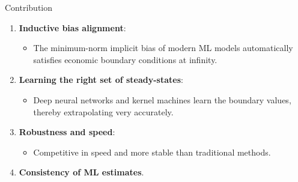 \documentclass[aspectratio=169,10pt]{beamer}
\newcommand{\emphcolor}[1]{\textbf{\textcolor{emphcolorval}{#1}}}
\begin{document}
\begin{frame}{Contribution}
	
\begin{enumerate}
	\item \emphcolor{Inductive bias alignment}:
	\begin{itemize}
		\item The minimum-norm implicit bias of modern ML models automatically satisfies economic boundary conditions at infinity.
	\end{itemize}
	\vspace{0.1in}
	\item \emphcolor{Learning the right set of steady-states}:
	\begin{itemize}
		\item Deep neural networks and kernel machines learn the boundary values, thereby extrapolating very accurately.
	\end{itemize}
	\vspace{0.1in}
	\item \emphcolor{Robustness and speed}:
	\begin{itemize}
		\item Competitive in speed and more stable than traditional methods.
	\end{itemize}
	\vspace{0.1in}
	\item \emphcolor{Consistency of ML estimates}.
\end{enumerate}

\end{frame}
\end{document}
